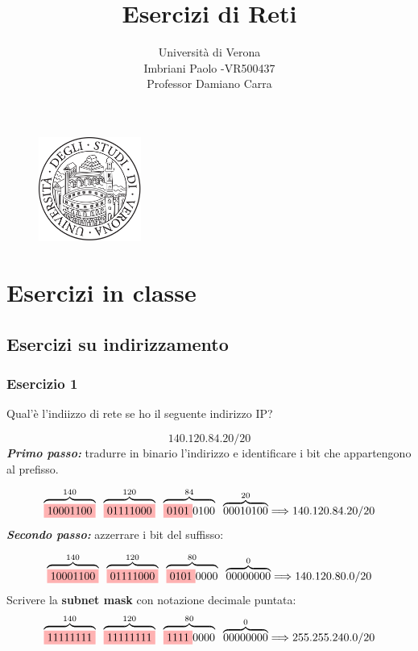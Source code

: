 \documentclass[a4paper]{article}
\title{Esercizi di Reti}
\author{Università di Verona\\Imbriani Paolo -VR500437\\Professor Damiano Carra}
\begin{document}
\begin{figure}
    \centering
    \includegraphics[width=0.3\textwidth]{UniversityofVerona.png}
\end{figure}

\maketitle 

\pagebreak

\tableofcontents

\pagebreak

\section{Esercizi in classe}

\subsection{Esercizi su indirizzamento}

\subsubsection{Esercizio 1}

Qual'è l'indiizzo di rete se ho il seguente indirizzo IP?

\[140.120.84.20/20\]
\textbf{\textit{Primo passo:}} tradurre in binario l'indirizzo e identificare i bit che appartengono al prefisso.

\[\overbrace{\colorbox{red!30!white}{10001100}}^{140} \; \; \overbrace{\colorbox{red!30!white}{01111000}}^{120} \; \; \overbrace{\colorbox{red!30!white}{0101}0100}^{84} \; \; \overbrace{00010100}^{20} \Longrightarrow 140.120.84.20/20\]
\textbf{\textit{Secondo passo:}} azzerrare i bit del suffisso:

\[\overbrace{\colorbox{red!30!white}{10001100}}^{140} \; \; \overbrace{\colorbox{red!30!white}{01111000}}^{120} \; \; \overbrace{\colorbox{red!30!white}{0101}0000}^{80} \; \; \overbrace{00000000}^{0} \Longrightarrow 140.120.80.0/20\]
Scrivere la\textbf{ subnet mask} con notazione decimale puntata:
\[\overbrace{\colorbox{red!30!white}{11111111}}^{140} \; \; \overbrace{\colorbox{red!30!white}{11111111}}^{120} \; \; \overbrace{\colorbox{red!30!white}{1111}0000}^{80} \; \; \overbrace{00000000}^{0} \Longrightarrow 255.255.240.0/20\]
\end{document}
